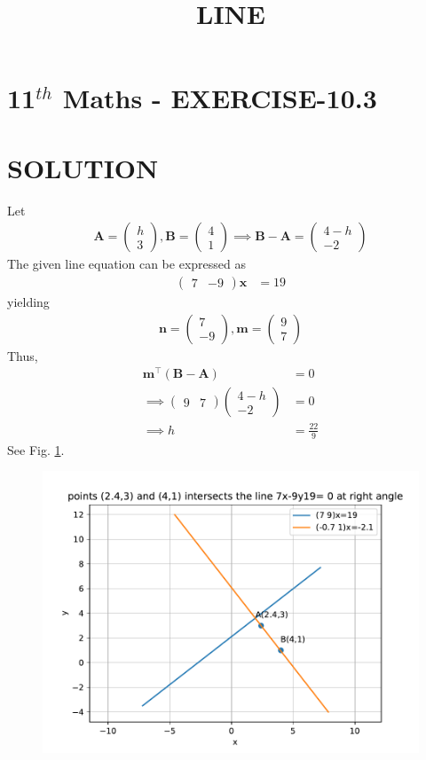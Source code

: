 \documentclass[12pt]{article}
\providecommand{\brak}[1]{\ensuremath{\left(#1\right)}}
\newcommand{\myvec}[1]{\ensuremath{\begin{pmatrix}#1\end{pmatrix}}}
\let\vec\mathbf
\begin{document}
\begin{center}
\title{\textbf{LINE}}
\date{\vspace{-5ex}} %
\maketitle
\end{center}

\section{11$^{th}$ Maths - EXERCISE-10.3}
\begin{enumerate}
\end{enumerate}
\section{SOLUTION}
\fi
Let
\begin{align}
\vec{A}=\myvec{h\\ 3},\vec{B}=\myvec{4\\ 1} 
\implies \vec{B}-\vec{A}=
\myvec{4-h\\ -2}
\end{align}
The given line equation  can be expressed as
\begin{align}
\myvec{7& -9}\vec{x}&=19
\end{align}
yielding 
\begin{align}
\vec{n}=\myvec{7\\ -9},
\vec{m}=\myvec{9\\ 7}
\end{align}
Thus, 
\begin{align}
	\vec{m}^\top\brak{\vec{B}- \vec{A}}&=0\\
\implies\myvec{9& 7}\myvec{4-h\\ -2}&=0\\
\implies h&=\frac{22}{9}
\end{align}
See Fig. 
		\ref{fig:chapters/11/10/3/10/Figure}.
\begin{figure}[h]
\centering
\includegraphics[width=\columnwidth]{chapters/11/10/3/10/figs/fig.pdf}
\caption{}
		\label{fig:chapters/11/10/3/10/Figure}
\end{figure}
\end{document}
